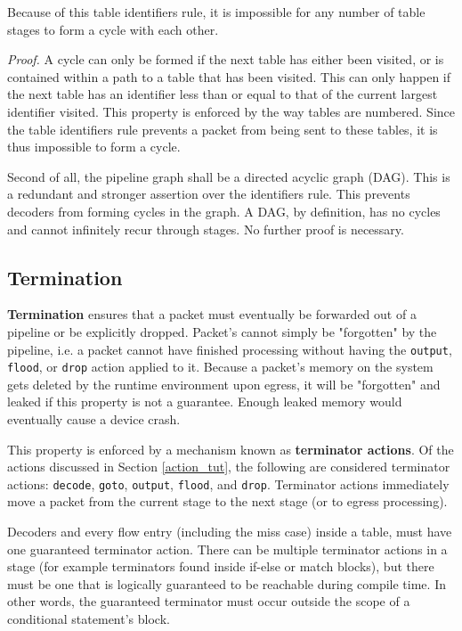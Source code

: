 Because of this table identifiers rule, it is impossible for any number of table stages to form a cycle with each other.

\textit{Proof.} A cycle can only be formed if the next table has either been visited, or is contained within a path to a table that has been visited. This can only happen if the next table has an identifier less than or equal to that of the current largest identifier visited. This property is enforced by the way tables are numbered. Since the table identifiers rule prevents a packet from being sent to these tables, it is thus impossible to form a cycle.

Second of all, the pipeline graph shall be a directed acyclic graph (DAG). This is a redundant and stronger assertion over the identifiers rule. This prevents decoders from forming cycles in the graph. A DAG, by definition, has no cycles and cannot infinitely recur through stages. No further proof is necessary.

\subsection{Termination} \label{termination_guide}

\textbf{Termination} ensures that a packet must eventually be forwarded out of a pipeline or be explicitly dropped. Packet's cannot simply be "forgotten" by the pipeline, i.e. a packet cannot have finished processing without having the \texttt{output}, \texttt{flood}, or \texttt{drop} action applied to it. Because a packet's memory on the system gets deleted by the runtime environment upon egress, it will be "forgotten" and leaked if this property is not a guarantee. Enough leaked memory would eventually cause a device crash.

This property is enforced by a mechanism known as \textbf{terminator actions}. Of the actions discussed in Section \ref{action_tut}, the following are considered terminator actions: \texttt{decode}, \texttt{goto}, \texttt{output}, \texttt{flood}, and \texttt{drop}. Terminator actions immediately move a packet from the current stage to the next stage (or to egress processing). 

Decoders and every flow entry (including the miss case) inside a table, must have one guaranteed terminator action. There can be multiple terminator actions in a stage (for example terminators found inside if-else or match blocks), but there must be one that is logically guaranteed to be reachable during compile time. In other words, the guaranteed terminator must occur outside the scope of a conditional statement's block.

